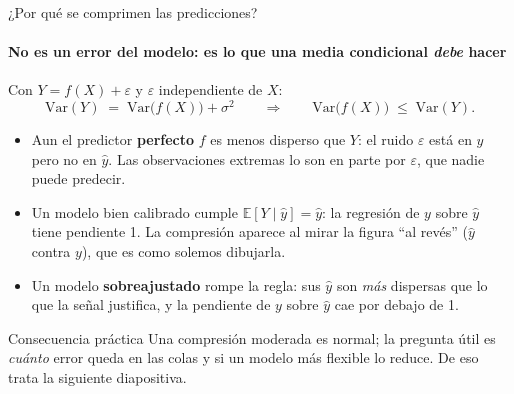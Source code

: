 \documentclass{beamer}
\newcommand{\E}{\mathbb{E}}
\newcommand{\Var}{\mathrm{Var}}
\newcommand{\1}{\mathbb{I}}
\begin{document}
\begin{frame}{¿Por qué se comprimen las predicciones?}
\framesubtitle{No es un error del modelo: es lo que una media condicional \emph{debe} hacer}
\small
Con $Y = f(X) + \varepsilon$ y $\varepsilon$ independiente de $X$:
\[ \Var(Y) \;=\; \Var\big(f(X)\big) + \sigma^2 \qquad \Longrightarrow \qquad \Var\big(f(X)\big) \;\leq\; \Var(Y). \]
\pause
\begin{itemize}\itemsep4pt
  \item Aun el predictor \textbf{perfecto} $f$ es menos disperso que $Y$: el ruido $\varepsilon$ está en $y$ pero no en $\hat{y}$. Las observaciones extremas lo son en parte por $\varepsilon$, que nadie puede predecir. \pause
  \item Un modelo bien calibrado cumple $\E[Y \mid \hat{y}] = \hat{y}$: la regresión de $y$ sobre $\hat{y}$ tiene pendiente 1. La compresión aparece al mirar la figura ``al revés'' ($\hat{y}$ contra $y$), que es como solemos dibujarla. \pause
  \item Un modelo \textbf{sobreajustado} rompe la regla: sus $\hat{y}$ son \emph{más} dispersas que lo que la señal justifica, y la pendiente de $y$ sobre $\hat{y}$ cae por debajo de 1.
\end{itemize}
\pause
\begin{block}{Consecuencia práctica}
Una compresión moderada es normal; la pregunta útil es \emph{cuánto} error queda en las colas y si un modelo más flexible lo reduce. De eso trata la siguiente diapositiva.
\end{block}
\end{frame}
\end{document}

